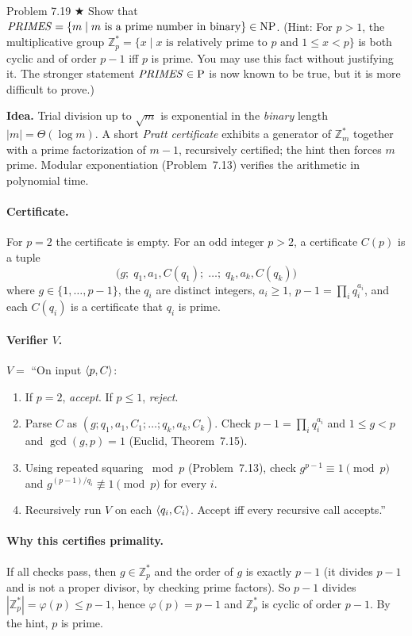 \begin{question}{Problem 7.19 $\bigstar$}
Show that $\mathit{PRIMES}=\{m\mid m\text{ is a prime number in binary}\}\in\mathrm{NP}$. (Hint: For $p>1$, the multiplicative group $\mathbb{Z}_p^*=\{x\mid x\text{ is relatively prime to $p$ and }1\le x<p\}$ is both cyclic and of order $p-1$ iff $p$ is prime. You may use this fact without justifying it. The stronger statement $\mathit{PRIMES}\in\mathrm{P}$ is now known to be true, but it is more difficult to prove.)
\end{question}
\begin{soln}
\textbf{Idea.} Trial division up to $\sqrt{m}$ is exponential in the \emph{binary} length $|m|=\Theta(\log m)$. A short \emph{Pratt certificate} exhibits a generator of $\mathbb{Z}_m^*$ together with a prime factorization of $m-1$, recursively certified; the hint then forces $m$ prime. Modular exponentiation (Problem~7.13) verifies the arithmetic in polynomial time.

\paragraph{Certificate.}
For $p=2$ the certificate is empty. For an odd integer $p>2$, a certificate $C(p)$ is a tuple
\[
\bigl(g;\; q_1,a_1,C(q_1);\; \dots;\; q_k,a_k,C(q_k)\bigr)
\]
where $g\in\{1,\dots,p-1\}$, the $q_i$ are distinct integers, $a_i\ge 1$, $p-1=\prod_i q_i^{a_i}$, and each $C(q_i)$ is a certificate that $q_i$ is prime.

\paragraph{Verifier $V$.}
$V=$ ``On input $\langle p,C\rangle$:
\begin{enumerate}
\item If $p=2$, \emph{accept}. If $p\le 1$, \emph{reject}.
\item Parse $C$ as $(g;q_1,a_1,C_1;\dots;q_k,a_k,C_k)$. Check $p-1=\prod_i q_i^{a_i}$ and $1\le g<p$ and $\gcd(g,p)=1$ (Euclid, Theorem~7.15).
\item Using repeated squaring $\bmod p$ (Problem~7.13), check $g^{p-1}\equiv 1\pmod{p}$ and $g^{(p-1)/q_i}\not\equiv 1\pmod{p}$ for every $i$.
\item Recursively run $V$ on each $\langle q_i,C_i\rangle$. Accept iff every recursive call accepts.''
\end{enumerate}

\paragraph{Why this certifies primality.}
If all checks pass, then $g\in\mathbb{Z}_p^*$ and the order of $g$ is exactly $p-1$ (it divides $p-1$ and is not a proper divisor, by checking prime factors). So $p-1$ divides $|\mathbb{Z}_p^*|=\varphi(p)\le p-1$, hence $\varphi(p)=p-1$ and $\mathbb{Z}_p^*$ is cyclic of order $p-1$. By the hint, $p$ is prime.


\end{soln}

